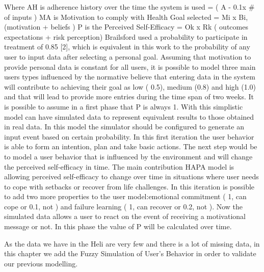 \documentclass{llncs}
\begin{document}
Where AH is adherence history over the time the system is used = ( A - 0.1x \# of inputs ) MA is Motivation to comply with Health Goal selected =  Mi x Bi, (motivation + beliefs ) P is the Perceived Self-Efficacy =  Ok x Rk ( outcomes expectations + risk perception)
Brailsford used a probability to participate in treatment of 0.85 [2], which is equivalent in this work to the probability of any user to input data after selecting a personal goal. Assuming that motivation to provide personal data is constant for all users, it is possible to model three main users types influenced by the normative believe that entering data in the system will contribute to achieving their goal as low ( 0.5), medium (0.8) and high (1.0) and that will lead to provide more entries during the time span of two weeks. It is possible to assume in a first phase that P is always 1.
With this simplistic model can have simulated data to represent equivalent results to those obtained in real data. In this model the simulator should be configured to generate an input event based on certain probability. In this first iteration the user behavior is able to form an intention, plan and take basic actions. The next step would be to model a user behavior that is influenced by the environment and will change the perceived self-efficacy in time.
The main contribution HAPA model is allowing perceived self-efficacy to change over time in situations where user needs to cope with setbacks or recover from life challenges. In this iteration is possible to add two more properties to the user model:emotional commitment ( 1, can cope or 0.1, not ) and failure learning ( 1, can recover or 0.2, not ). Now the simulated data allows a user to react on the event of receiving a motivational message or not. In this phase the value of P will be calculated over time.

As the data we have in the Heli are very few and there is a lot of missing data, in this chapter we add the Fuzzy Simulation of User's Behavior in order to validate our previous modelling.
\end{document}
